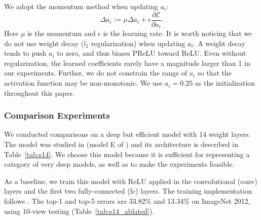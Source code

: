 \documentclass[10pt,twocolumn,letterpaper]{article}
\begin{document}
We adopt the momentum method when updating $a_i$:
\begin{equation}\label{eq:update}
\Delta a_i := \mu \Delta a_i + \epsilon \frac{\partial \mathcal{E}}{\partial a_i}.
\end{equation}
Here $\mu$ is the momentum and $\epsilon$ is the learning rate. It is worth noticing that we do not use weight decay ($l_2$ regularization) when updating $a_i$. A weight decay tends to push $a_i$ to zero, and thus biases PReLU toward ReLU. Even without regularization, the learned coefficients rarely have a magnitude larger than 1 in our experiments.
Further, we do not constrain the range of $a_i$ so that the activation function may be non-monotonic. We use $a_i=0.25$ as the initialization throughout this paper.

\subsubsection*{Comparison Experiments}

We conducted comparisons on a deep but efficient model with 14 weight layers. The model was studied in \cite{He2014a} (model E of \cite{He2014a}) and its architecture is described in Table~\ref{tab:s14}. We choose this model because it is sufficient for representing a category of very deep models, as well as to make the experiments feasible.

As a baseline, we train this model with ReLU applied in the convolutional (conv) layers and the first two fully-connected (fc) layers. The training implementation follows \cite{He2014a}. The top-1 and top-5 errors are 33.82\% and 13.34\% on ImageNet 2012, using 10-view testing (Table~\ref{tab:s14_ablated}).
\end{document}
